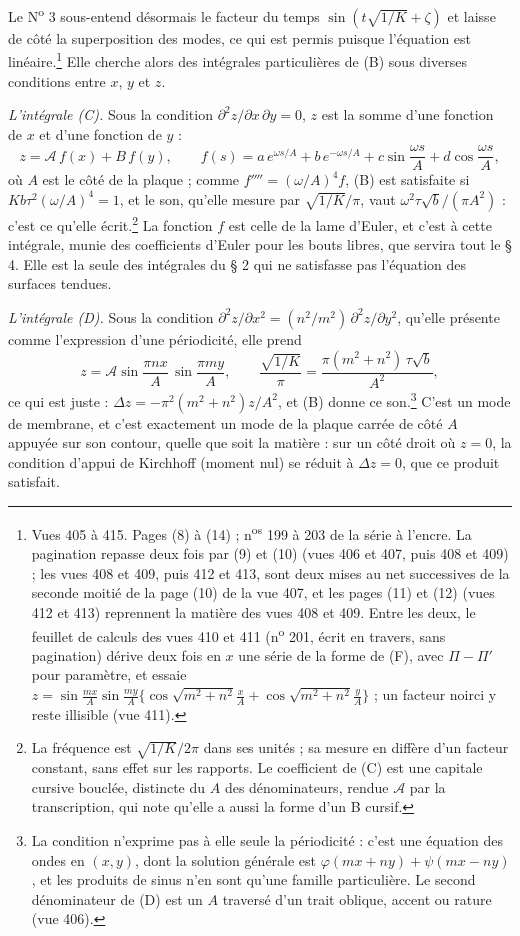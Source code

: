 \documentclass[11pt,a4paper]{article}
\begin{document}
Le N\textsuperscript{o} 3 sous-entend désormais le facteur du temps
$\sin(t\sqrt{1/K} + \zeta)$ et laisse de côté la superposition des modes, ce qui est
permis puisque l'équation est linéaire.\footnote{Vues 405 à 415. Pages (8) à (14) ;
n\textsuperscript{os} 199 à 203 de la série à l'encre. La pagination repasse deux fois
par (9) et (10) (vues 406 et 407, puis 408 et 409) ; les vues 408 et 409, puis 412 et 413, sont
deux mises au net successives de la seconde moitié de la page (10) de la vue 407, et
les pages (11) et (12) (vues 412 et 413) reprennent la matière des vues 408 et 409.
Entre les deux, le feuillet de calculs des vues 410 et 411 (n\textsuperscript{o} 201,
écrit en travers, sans pagination) dérive deux fois en $x$ une série de la forme de
(F), avec $\Pi - \Pi'$ pour paramètre, et essaie
$z = \sin\frac{mx}{A}\sin\frac{my}{A}\{\cos\sqrt{m^2+n^2}\frac{x}{A} + \cos\sqrt{m^2+n^2}\frac{y}{A}\}$ ;
un facteur noirci y reste illisible (vue 411).} Elle cherche alors des intégrales
particulières de (B) sous diverses conditions entre $x$, $y$ et $z$.

\emph{L'intégrale (C).} Sous la condition $\partial^2 z/\partial x\,\partial y = 0$, $z$
est la somme d'une fonction de $x$ et d'une fonction de $y$ :
\[
z = \mathcal{A}\,f(x) + B\,f(y), \qquad
f(s) = a\,e^{\omega s/A} + b\,e^{-\omega s/A} + c\sin\frac{\omega s}{A} + d\cos\frac{\omega s}{A},
\]
où $A$ est le côté de la plaque ; comme $f'''' = (\omega/A)^4 f$, (B) est satisfaite si
$Kb\tau^2(\omega/A)^4 = 1$, et le son, qu'elle mesure par $\sqrt{1/K}/\pi$, vaut
$\omega^2\tau\sqrt b/(\pi A^2)$ : c'est ce qu'elle écrit.\footnote{La fréquence est
$\sqrt{1/K}/2\pi$ dans ses unités ; sa mesure en diffère d'un facteur constant, sans
effet sur les rapports. Le coefficient de (C) est une capitale cursive bouclée,
distincte du $A$ des dénominateurs, rendue $\mathcal{A}$ par la transcription, qui
note qu'elle a aussi la forme d'un B cursif.} La fonction $f$ est celle de la lame
d'Euler, et c'est à cette intégrale, munie des coefficients d'Euler pour les bouts
libres, que servira tout le § 4. Elle est la seule des intégrales du § 2 qui ne
satisfasse pas l'équation des surfaces tendues.

\emph{L'intégrale (D).} Sous la condition
$\partial^2 z/\partial x^2 = (n^2/m^2)\,\partial^2 z/\partial y^2$, qu'elle présente
comme l'expression d'une périodicité, elle prend
\[
z = \mathcal{A}\sin\frac{\pi n x}{A}\,\sin\frac{\pi m y}{A}, \qquad
\frac{\sqrt{1/K}}{\pi} = \frac{\pi(m^2+n^2)\,\tau\sqrt b}{A^2},
\]
ce qui est juste : $\Delta z = -\pi^2(m^2+n^2)z/A^2$, et (B) donne ce son.\footnote{La
condition n'exprime pas à elle seule la périodicité : c'est une équation des ondes en
$(x,y)$, dont la solution générale est $\varphi(mx+ny) + \psi(mx-ny)$, et les produits
de sinus n'en sont qu'une famille particulière. Le second dénominateur de (D) est un
$A$ traversé d'un trait oblique, accent ou rature (vue 406).} C'est un mode de
membrane, et c'est exactement un mode de la plaque carrée de côté $A$ appuyée sur son
contour, quelle que soit la matière : sur un côté droit où $z = 0$, la condition
d'appui de Kirchhoff (moment nul) se réduit à $\Delta z = 0$, que ce produit
satisfait.
\end{document}
